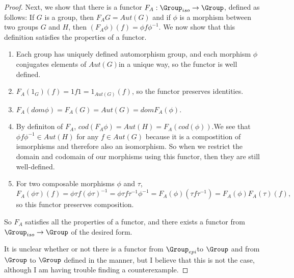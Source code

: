 \documentclass[main.tex]{subfiles}
\begin{document}
\begin{proof}
Next, we show that there is a functor $F_A: \Group_{iso} \rightarrow \Group$, defined as follows: If $G$ is a group, then $F_AG = Aut(G)$ and if $\phi$ is a morphism between two groups $G$ and $H$, then $(F_A\phi)(f) = \phi f \phi^{-1}$. We now show that this definition satisfies the properties of a functor. 
\begin{enumerate}
    \item Each group has uniquely defined automorphism group, and each morphism $\phi$ conjugates elements of $Aut(G)$in a unique way, so the functor is well defined. 
    \item $F_A(1_G)(f) = 1f1 = 1_{Aut(G)}(f)$, so the functor preserves identities. 
    \item $F_A(dom \phi) = F_A(G) = Aut(G) = dom F_A(\phi)$.
    \item By definiton of $F_A$, $cod(F_A\phi) = Aut(H) = F_A(cod(\phi))$.We see that $\phi f \phi^{-1} \in Aut(H)$ for any $f \in Aut(G)$ because it is a compostition of ismorphisms and therefore also an isomorphism. So when we restrict the domain and codomain of our morphisms using this functor, then they are still well-defined. 
    \item For two composable morphisms $\phi$ and $\tau$, \[F_A(\phi\tau)(f) = \phi\tau f (\phi\tau)^{-1} = \phi \tau f \tau^{-1} \phi^{-1} = F_A(\phi)(\tau f \tau^{-1}) = F_A(\phi)F_A(\tau)(f),\] so this functor preserves composition.
    
\end{enumerate}
So $F_A$ satisfies all the properties of a functor, and there exists a functor from $\Group_{iso} \rightarrow \Group$ of the desired form. 

It is unclear whether or not there is a functor from  $\Group_{epi}$to $\Group$ and from $\Group$ to $\Group$ defined in the manner, but I believe that this is not the case, although I am having trouble finding a counterexample. 
\end{proof}
\end{document}

